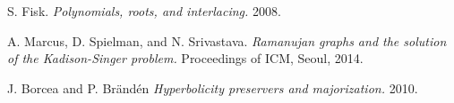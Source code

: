 \documentclass[a0,landscape]{a0poster}
\begin{document}
\begin{multicols}{2}

\nocite{*} %
\begin{thebibliography}{9}
  S. Fisk. {\em Polynomials, roots, and interlacing.} 2008.

  A. Marcus, D. Spielman, and N. Srivastava. {\em Ramanujan graphs and the solution of the Kadison-Singer problem.} Proceedings of ICM, Seoul, 2014.

  J. Borcea and P. Br\"{a}nd\'{e}n {\em Hyperbolicity preservers and majorization.} 2010.
\end{thebibliography}



\end{multicols}
\end{document}
